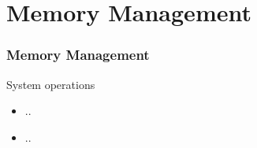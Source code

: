 \section{Memory Management}
\begin{frame}
  \frametitle{Memory Management}
  \begin{block}{System operations}
    \begin{itemize}
      \item ..
      \item ..
    \end{itemize}
  \end{block}
\end{frame}
